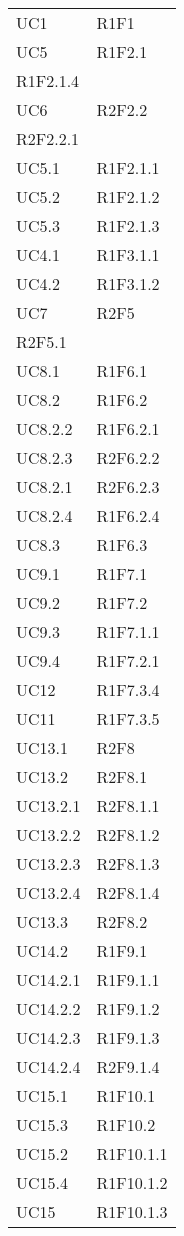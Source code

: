 \begin{longtable}{|C{6.5cm}|C{6.5cm}|}
	\tabularnewline

	UC1 & R1F1 \\
	UC5 & \centering R1F2.1 \\ R1F2.1.4 \tabularnewline
	UC6 & \centering R2F2.2 \\ R2F2.2.1 \tabularnewline
	UC5.1 & R1F2.1.1 \\
	UC5.2 & R1F2.1.2 \\
	UC5.3 & R1F2.1.3 \\
	UC4.1 & R1F3.1.1 \\
	UC4.2 & R1F3.1.2 \\
	UC7 & \centering R2F5 \\ R2F5.1 \tabularnewline
	UC8.1 & R1F6.1 \\
    UC8.2 & R1F6.2 \\
    UC8.2.2 & R1F6.2.1 \\
    UC8.2.3 & R2F6.2.2 \\
    UC8.2.1 & R2F6.2.3 \\
    UC8.2.4 & R1F6.2.4 \\
	UC8.3 & R1F6.3 \\
	UC9.1 & R1F7.1 \\
	UC9.2 & R1F7.2 \\
	UC9.3 & R1F7.1.1 \\
	UC9.4 & R1F7.2.1 \\
	UC12 & R1F7.3.4 \\
	UC11 & R1F7.3.5 \\
	UC13.1 & R2F8 \\
	UC13.2 & R2F8.1 \\
	UC13.2.1 & R2F8.1.1 \\
	UC13.2.2 & R2F8.1.2 \\
	UC13.2.3 & R2F8.1.3 \\
	UC13.2.4 & R2F8.1.4 \\
	UC13.3 & R2F8.2 \\
	UC14.2 & R1F9.1 \\
	UC14.2.1 & R1F9.1.1 \\
	UC14.2.2 & R1F9.1.2 \\
	UC14.2.3 & R1F9.1.3 \\
	UC14.2.4 & R2F9.1.4 \\
	UC15.1 & R1F10.1 \\
	UC15.3 & R1F10.2 \\
	UC15.2 & R1F10.1.1 \\
	UC15.4 & R1F10.1.2 \\
	UC15 & R1F10.1.3 \\

\end{longtable}
